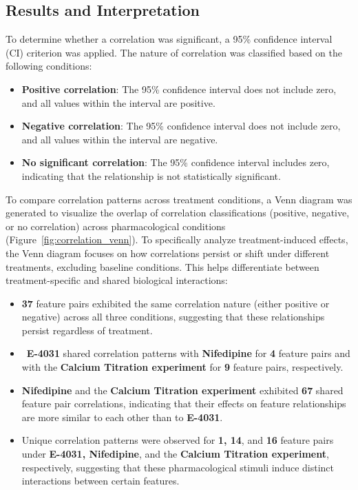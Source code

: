 \documentclass{report}
\begin{document}
    \subsection{Results and Interpretation}
    To determine whether a correlation was significant, a 95\% confidence interval (CI) criterion was applied. The nature of correlation was classified based on the following conditions:
    \begin{itemize}
        \item \textbf{Positive correlation}: The 95\% confidence interval does not include zero, and all values within the interval are positive.
        \item \textbf{Negative correlation}: The 95\% confidence interval does not include zero, and all values within the interval are negative.
        \item \textbf{No significant correlation}: The 95\% confidence interval includes zero, indicating that the relationship is not statistically significant.
    \end{itemize}
    
    To compare correlation patterns across treatment conditions, a Venn diagram was generated to visualize the overlap of correlation classifications (positive, negative, or no correlation) across pharmacological conditions (Figure~\ref{fig:correlation_venn}). To specifically analyze treatment-induced effects, the Venn diagram focuses on how correlations persist or shift under different treatments, excluding baseline conditions. This helps differentiate between treatment-specific and shared biological interactions:
    \begin{itemize}
        \item \textbf{37} feature pairs exhibited the same correlation nature (either positive or negative) across all three conditions, suggesting that these relationships persist regardless of treatment.
        \item \ \textbf{E-4031} shared correlation patterns with \textbf{Nifedipine} for \textbf{4} feature pairs and with the \textbf{Calcium Titration experiment} for \textbf{9} feature pairs, respectively.
        \item \textbf{Nifedipine} and the \textbf{Calcium Titration experiment} exhibited \textbf{67} shared feature pair correlations, indicating that their effects on feature relationships are more similar to each other than to \textbf{E-4031}.
        \item Unique correlation patterns were observed for \textbf{1, 14}, and \textbf{16} feature pairs under \textbf{E-4031, Nifedipine}, and the \textbf{Calcium Titration experiment}, respectively, suggesting that these pharmacological stimuli induce distinct interactions between certain features.
    \end{itemize}
\end{document}
